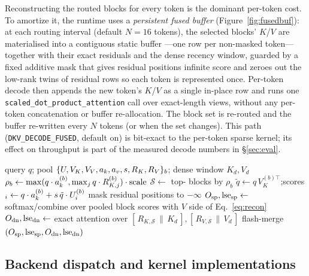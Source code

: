 Reconstructing the routed blocks for every token is the dominant per-token cost. To amortize
it, the runtime uses a \emph{persistent fused buffer} (Figure~\ref{fig:fusedbuf}): at each routing interval (default
$N{=}16$ tokens), the selected blocks' $K$/$V$ are materialised into a contiguous static buffer
---one row per non-masked token---together with their exact residuals and the dense recency
window, guarded by a fixed additive mask that gives residual positions infinite score and zeroes
out the low-rank twins of residual rows so each token is represented once. Per-token decode then
appends the new token's $K$/$V$ as a single in-place row and runs one
\texttt{scaled\_dot\_product\_attention} call over exact-length views, without any per-token
concatenation or buffer re-allocation. The block set is re-routed and the buffer re-written
every $N$ tokens (or when the set changes). This path (\texttt{DKV\_DECODE\_FUSED},
default on) is bit-exact to the per-token sparse kernel; its effect on throughput is part of
the measured decode numbers in \S\ref{sec:eval}.

\begin{\algenv}[t]
\caption{Fused routed decode attention for query $q$ (one layer)}
\label{alg:decode}
\begin{algorithmic}[1]
\Require query $q$; pool $\{U,V_K,V_V,a_k,a_v,s,R_K,R_V\}_{b}$; dense window $K_d,V_d$
\State $\rho_b \gets \max(q\cdot a_k^{(b)}, \max_j q\cdot R^{(b)}_{K,j})\cdot\text{scale}$ 
\State $\mathcal S \gets$ top-\topk{} blocks by $\rho_b$
                                  
  \State $\tilde q \gets q\,V_K^{(b)\top}$;\quad scores$_i \gets q\cdot a_k^{(b)} + s\,\tilde q\cdot U^{(b)}_i$
  \State mask residual positions to $-\infty$
\EndFor
\State $O_{\text{sp}},\operatorname{lse}_{\text{sp}} \gets$ softmax/combine over pooled block scores with $V$ side of Eq.~\eqref{eq:recon}
\State $O_{\text{dn}},\operatorname{lse}_{\text{dn}} \gets$ exact attention over $[\,R_{K,\mathcal S}\,\|\,K_d\,],[\,R_{V,\mathcal S}\,\|\,V_d\,]$
\State \Return flash-merge$(O_{\text{sp}},\operatorname{lse}_{\text{sp}},O_{\text{dn}},\operatorname{lse}_{\text{dn}})$ 
\end{algorithmic}
\end{\algenv}

\subsection{Backend dispatch and kernel implementations}
\label{sec:decode-backends}

